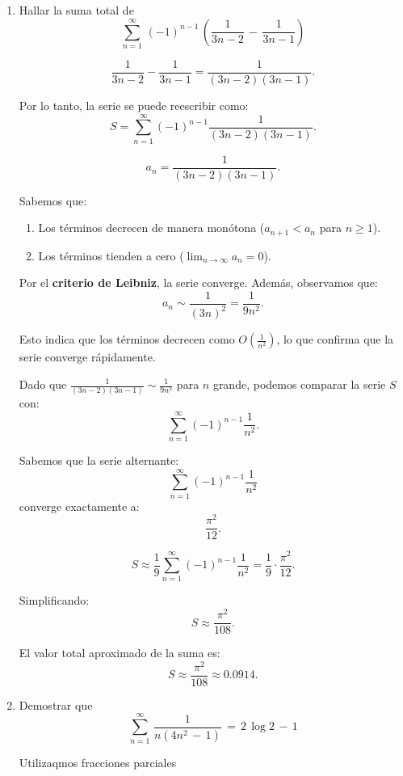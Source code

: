 \documentclass{article}
\begin{document}
\begin{enumerate}
En este caso, \(\frac{\log n}{n+1}\) decrece para \(n\) grande.


Por lo tanto la serie diverge debido a que se introduce el factor interno \(\sum_{k=1}^n \frac{1}{k}\)



\item Hallar la suma total de
\[
\sum_{n=1}^\infty\,(-1)^{n-1}\,\left(\frac{1}{3n-2}\,-\,\frac{1}{3n-1}\right)
\]

\[
\frac{1}{3n - 2} - \frac{1}{3n - 1} = \frac{1}{(3n - 2)(3n - 1)}.
\]

Por lo tanto, la serie se puede reescribir como:
\[
S = \sum_{n=1}^\infty (-1)^{n-1} \frac{1}{(3n - 2)(3n - 1)}.
\]



\[
a_n = \frac{1}{(3n - 2)(3n - 1)}.
\]

Sabemos que:
\begin{enumerate}
    \item Los términos decrecen de manera monótona (\(a_{n+1} < a_n\) para \(n \geq 1\)).
    \item Los términos tienden a cero (\(\lim_{n \to \infty} a_n = 0\)).
\end{enumerate}

Por el \textbf{criterio de Leibniz}, la serie converge. Además, observamos que:
\[
a_n \sim \frac{1}{(3n)^2} = \frac{1}{9n^2}.
\]

Esto indica que los términos decrecen como \(O\left(\frac{1}{n^2}\right)\), lo que confirma que la serie converge rápidamente.


Dado que \(\frac{1}{(3n - 2)(3n - 1)} \sim \frac{1}{9n^2}\) para \(n\) grande, podemos comparar la serie \(S\) con:
\[
\sum_{n=1}^\infty (-1)^{n-1} \frac{1}{n^2}.
\]

Sabemos que la serie alternante:
\[
\sum_{n=1}^\infty (-1)^{n-1} \frac{1}{n^2}
\]
converge exactamente a:
\[
\frac{\pi^2}{12}.
\]

\[
S \approx \frac{1}{9} \sum_{n=1}^\infty (-1)^{n-1} \frac{1}{n^2} = \frac{1}{9} \cdot \frac{\pi^2}{12}.
\]

Simplificando:
\[
S \approx \frac{\pi^2}{108}.
\]

El valor total aproximado de la suma es:
\[
\boxed{S \approx \frac{\pi^2}{108} \approx 0.0914.}
\]

\item Demostrar que
\[
\sum_{n=1}^\infty\,\dfrac{1}{n(4n^2\,-\,1)}\,=\,2\,\log 2\,-\,1
\]


Utilizaqmos fracciones parciales


\end{enumerate}
\end{document}
